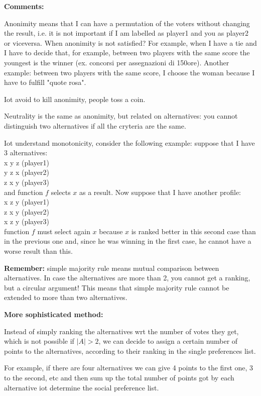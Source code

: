 \bigskip
\noindent \textbf{Comments:}

\noindent Anonimity means that I can have a permutation of the voters without 
changing the result, i.e. it is not important if I am labelled as player1 and 
you as player2 or viceversa. When anonimity is not satisfied? For example, 
when I have a tie and I have to decide that, for example, between two players 
with the same score the youngest is the winner (ex. concorsi per assegnazioni di 
150ore). Another example: between two players with the same score, I choose the 
woman because I have to fulfill "quote rosa".

\noindent Iot avoid to kill anonimity, people toss a coin.

\bigskip
\noindent Neutrality is the same as anonimity, but related on alternatives: you 
cannot distinguish two alternatives if all the cryteria are the same. 

\bigskip
\noindent Iot understand monotonicity, consider the following example: suppose that I have 3 alternatives:\\
x 	y 	z (player1)\\
y 	z	x (player2)\\
z	x 	y (player3)\\
and function $f$ selects $x$ as a result. Now suppose that I have another 
profile:\\
x 	z 	y (player1)\\
z 	x 	y (player2)\\
x 	z 	y (player3)\\
function $f$ must select again $x$ because $x$ is ranked better in this second 
case than in the previous one and, since he was winning in the first case, he 
cannot have a worse result than this.

\bigskip
\noindent \textbf{Remember:} simple majority rule means mutual comparison between 
alternatives. In case the alternatives are more than 2, you cannot get a ranking, but a circular argument! 
This means that simple majority rule cannot be extended to more than two 
alternatives.

\bigskip
\noindent \textbf{More sophisticated method:}

\noindent Instead of simply ranking the alternatives wrt the number of votes they get, which is not possible if $|A| > 2$, we can decide to assign a certain number of points to the alternatives, according to their ranking in the single preferences list.

\noindent For example, if there are four alternatives we can give 4 points to the first one, 3 to the second, etc and then sum up the total number of points got by each alternative iot determine the social preference list.

